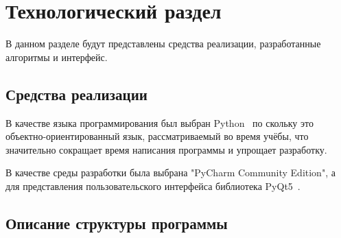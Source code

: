 \chapter{Технологический раздел}
\label{cha:impl}
В данном разделе будут представлены средства реализации, разработанные алгоритмы и интерфейс.

\section{Средства реализации}
\label{sec:realisation}
В качестве языка программирования был выбран Python~\cite{python} по скольку это объектно-ориентированный язык, рассматриваемый во время учёбы, что значительно сокращает время написания программы и упрощает разработку.
\par В качестве среды разработки была выбрана "PyCharm Community Edition"\!,  а для представления пользовательского интерфейса библиотека PyQt5~\cite{pyqt}.
\section{Описание структуры программы}
\label{sec:structure}
